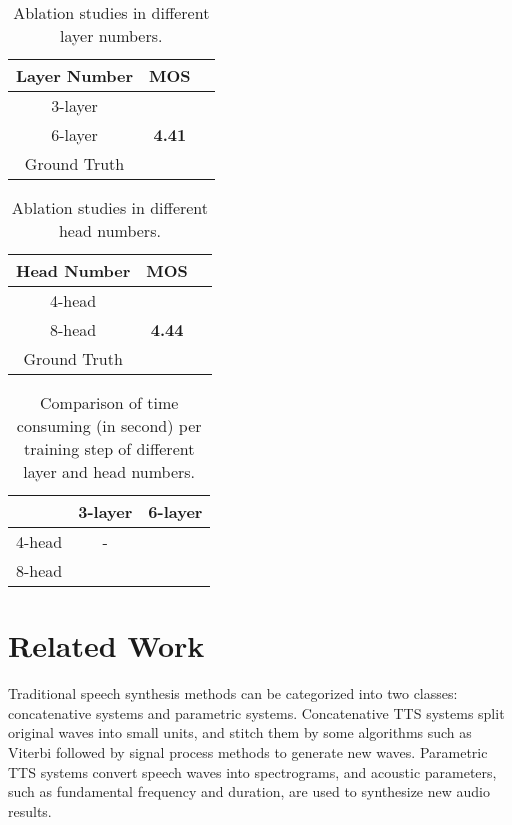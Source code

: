 \documentclass[letterpaper]{article} \usepackage{aaai19}  \usepackage{times}  \usepackage{helvet}  \usepackage{courier}  \usepackage{url}  \usepackage{graphicx}  \frenchspacing
\begin{document}
\begin{table}[t!]
  \centering
  \begin{tabular}{ccc}
    \toprule
    Layer Number   &   MOS    \\
    \midrule
    3-layer                 &                  \\
    6-layer        &   \textbf{4.41}            \\
    \midrule
    Ground Truth            &           \\
    \bottomrule
  \end{tabular}
  \caption{Ablation studies in different layer numbers.}
  \label{tab:mos_ln}
\end{table}

\begin{table}[t!]
  \centering
  \begin{tabular}{ccc}
    \toprule
    Head Number   &   MOS    \\
    \midrule
    4-head                 &                  \\
    8-head        &   \textbf{4.44}            \\
    \midrule
    Ground Truth           &           \\
    \bottomrule
  \end{tabular}
  \caption{Ablation studies in different head numbers.}
  \label{tab:mos_hn}
\end{table}


\begin{table}[t!]
  \centering
  \begin{tabular}{c|cc}
    \toprule
                    &   3-layer    &   6-layer  \\
    \hline
    4-head    &   -                   &   ~~~         \\
    8-head    &                 &   ~~~         \\
    \bottomrule
  \end{tabular}
  \caption{Comparison of time consuming (in second) per training step of different layer and head numbers.}
  \label{tab:speed_hp}
\end{table}

\section{Related Work}

Traditional speech synthesis methods can be categorized into two classes: concatenative systems and parametric systems. Concatenative TTS systems \cite{hunt1996unit,black1997automatically} split original waves into small units, and stitch them by some algorithms such as Viterbi \cite{viterbi1967error} followed by signal process methods \cite{charpentier1986diphone,verhelst1993overlap} to generate new waves. Parametric TTS systems \cite{tokuda2000speech,zen2009statistical,ze2013statistical,tokuda2013speech} convert speech waves into spectrograms, and acoustic parameters,  such as fundamental frequency and duration, are used to synthesize new audio results.
\end{document}
